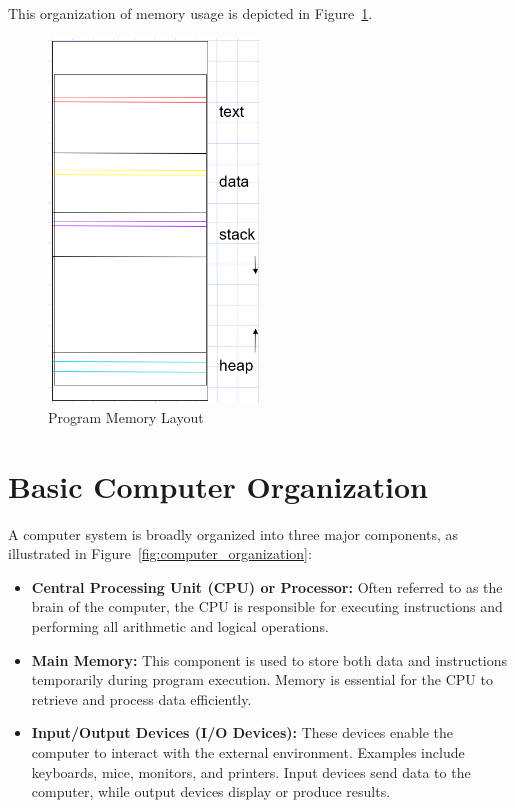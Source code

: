 \documentclass[12pt]{book}
\begin{document}
This organization of memory usage is depicted in Figure~\ref{fig:program_memory}.

\begin{figure}[ht]
    \centering
    \includegraphics[width=0.5\textwidth]{images/program_memory.png}
    \caption{Program Memory Layout}
    \label{fig:program_memory}
\end{figure}


\section{Basic Computer Organization}

A computer system is broadly organized into three major components, as illustrated in Figure~\ref{fig:computer_organization}:

\begin{itemize}
    \item \textbf{Central Processing Unit (CPU) or Processor:} Often referred to as the brain of the computer, the CPU is responsible for executing instructions and performing all arithmetic and logical operations.
    
    \item \textbf{Main Memory:} This component is used to store both data and instructions temporarily during program execution. Memory is essential for the CPU to retrieve and process data efficiently.
    
    \item \textbf{Input/Output Devices (I/O Devices):} These devices enable the computer to interact with the external environment. Examples include keyboards, mice, monitors, and printers. Input devices send data to the computer, while output devices display or produce results.
\end{itemize}
\end{document}
